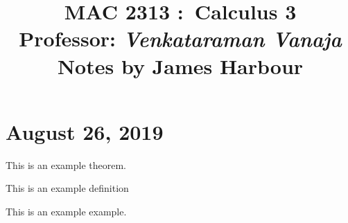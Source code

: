 \documentclass{scrartcl}
\title{
    \vspace{2in}
    \textmd{\textbf{MAC 2313 :\ Calculus 3}}\\
    \vspace{0.1in}\large{Professor: \textit{Venkataraman Vanaja}}\\
    \vspace{3in}
    Notes by James Harbour
}
\begin{document}
\maketitle
\newpage

\section{August 26, 2019}
\begin{theorem}
  This is an example theorem.
\end{theorem}

\begin{definition}
  This is an example definition
\end{definition}

\begin{example}
  This is an example example.
\end{example}
\end{document}
